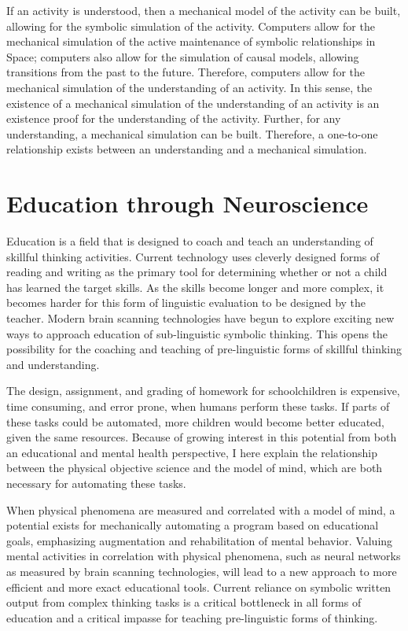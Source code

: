 If an activity is understood, then a mechanical model of the activity
can be built, allowing for the symbolic simulation of the activity.
Computers allow for the mechanical simulation of the active
maintenance of symbolic relationships in Space; computers also allow
for the simulation of causal models, allowing transitions from the
past to the future.  Therefore, computers allow for the mechanical
simulation of the understanding of an activity.  In this sense, the
existence of a mechanical simulation of the understanding of an
activity is an existence proof for the understanding of the activity.
Further, for any understanding, a mechanical simulation can be built.
Therefore, a one-to-one relationship exists between an understanding
and a mechanical simulation.

\section{Education through Neuroscience}

Education is a field that is designed to coach and teach an
understanding of skillful thinking activities.  Current technology
uses cleverly designed forms of reading and writing as the primary
tool for determining whether or not a child has learned the target
skills.  As the skills become longer and more complex, it becomes
harder for this form of linguistic evaluation to be designed by the
teacher.  Modern brain scanning technologies have begun to explore
exciting new ways to approach education of sub-linguistic symbolic
thinking.  This opens the possibility for the coaching and teaching of
pre-linguistic forms of skillful thinking and understanding.

The design, assignment, and grading of homework for schoolchildren is
expensive, time consuming, and error prone, when humans perform these
tasks.  If parts of these tasks could be automated, more children
would become better educated, given the same resources.  Because of
growing interest in this potential from both an educational and mental
health perspective, I here explain the relationship between the
physical objective science and the model of mind, which are both
necessary for automating these tasks.

When physical phenomena are measured and correlated with a model of
mind, a potential exists for mechanically automating a program based
on educational goals, emphasizing augmentation and rehabilitation of
mental behavior.  Valuing mental activities in correlation with
physical phenomena, such as neural networks as measured by brain
scanning technologies, will lead to a new approach to more efficient
and more exact educational tools.  Current reliance on symbolic
written output from complex thinking tasks is a critical bottleneck in
all forms of education and a critical impasse for teaching
pre-linguistic forms of thinking.

